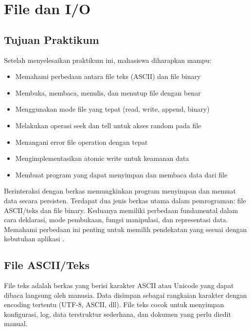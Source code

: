 \documentclass[../main.tex]{subfiles}
\begin{document}
\chapter{File dan I/O}

\section*{Tujuan Praktikum}
Setelah menyelesaikan praktikum ini, mahasiswa diharapkan mampu:
\begin{itemize}
  \item Memahami perbedaan antara file teks (ASCII) dan file binary
  \item Membuka, membaca, menulis, dan menutup file dengan benar
  \item Menggunakan mode file yang tepat (read, write, append, binary)
  \item Melakukan operasi seek dan tell untuk akses random pada file
  \item Menangani error file operation dengan tepat
  \item Mengimplementasikan atomic write untuk keamanan data
  \item Membuat program yang dapat menyimpan dan membaca data dari file
\end{itemize}

Berinteraksi dengan berkas memungkinkan program menyimpan dan memuat data secara persisten. Terdapat dua jenis berkas utama dalam pemrograman: file ASCII/teks dan file binary. Keduanya memiliki perbedaan fundamental dalam cara deklarasi, mode pembukaan, fungsi manipulasi, dan representasi data. Memahami perbedaan ini penting untuk memilih pendekatan yang sesuai dengan kebutuhan aplikasi \parencite{gnu-c-manual,cpp-reference,free-pascal-docs}.

\section{File ASCII/Teks}

File teks adalah berkas yang berisi karakter ASCII atau Unicode yang dapat dibaca langsung oleh manusia. Data disimpan sebagai rangkaian karakter dengan encoding tertentu (UTF-8, ASCII, dll). File teks cocok untuk menyimpan konfigurasi, log, data terstruktur sederhana, dan dokumen yang perlu diedit manual.
\end{document}
